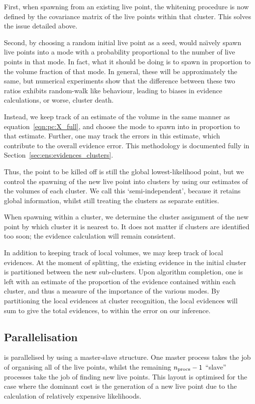 First, when spawning from an existing live point, the whitening procedure is now defined by the covariance matrix of the live points within that cluster. This solves the issue detailed above.

Second, by choosing a random initial live point as a seed, \PolyChord{} would na\"{\i}vely spawn live points into a mode with a probability proportional to the number of live points in that mode. In fact, what it should be doing is to spawn in proportion to the volume fraction of that mode. In general, these will be approximately the same, but numerical experiments show that the difference between these two ratios exhibits random-walk like behaviour, leading to biases in evidence calculations, or worse, cluster death. 

Instead, we keep track of an estimate of the volume in the same manner as equation~\eqref{eqn:pc:X_full}, and choose the mode to spawn into in proportion to that estimate. Further, one may track the errors in this estimate, which contribute to the overall evidence error. This methodology is documented fully in Section~\ref{sec:ens:evidences_clusters}.

Thus, the point to be killed off is still the global lowest-likelihood point, but we control the spawning of the new live point into clusters by using our estimates of the volumes of each cluster. We call this `semi-independent', because it retains global information, whilst still treating the clusters as separate entities. 

When spawning within a cluster, we determine the cluster assignment of the new point by which cluster it is nearest to. It does not matter if clusters are identified too soon; the evidence calculation will remain consistent.

In addition to keeping track of local volumes, we may keep track of local evidences. At the moment of splitting, the existing evidence in the initial cluster is partitioned between the new sub-clusters. Upon algorithm completion, one is left with an estimate of the proportion of the evidence contained within each cluster, and thus a measure of the importance of the various modes. By partitioning the local evidences at cluster recognition, the local evidences will sum to give the total evidences, to within the error on our inference.


\subsection{Parallelisation}
\label{sec:pc:parallelisation}
\PolyChord{} is parallelised by \openMPI{} using a master-slave structure.  One master process takes the job of organising all of the live points, whilst the remaining \({n_{\mathrm{procs}}-1}\) ``slave'' processes take the job of finding new live points. This layout is optimised for the case where the dominant cost is the generation of a new live point due to the calculation of relatively expensive likelihoods.

